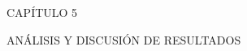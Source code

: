 \newpage
\thispagestyle{empty}
\vspace*{\fill}
\begingroup
\centering
\begin{flushright}{\fontsize{60}{70}\selectfont CAPÍTULO 5}\end{flushright}
\vspace{10 mm}
\begin{flushright}{\fontsize{40}{50}\selectfont ANÁLISIS Y DISCUSIÓN DE RESULTADOS }\end{flushright}
\endgroup
\vspace*{\fill}
\newpage